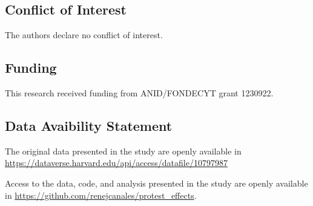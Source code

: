 \documentclass[
  12pt,
  letterpaper,
  DIV=11,
  numbers=noendperiod]{scrartcl}
\begin{document}
\subsection{Conflict of Interest}\label{conflict-of-interest}

The authors declare no conflict of interest.

\subsection{Funding}\label{funding}

This research received funding from ANID/FONDECYT grant 1230922.

\subsection{Data Avaibility Statement}\label{data-avaibility-statement}

The original data presented in the study are openly available in
\url{https://dataverse.harvard.edu/api/access/datafile/10797987}

Access to the data, code, and analysis presented in the study are openly
available in \url{https://github.com/renejcanales/protest_effects}.
\end{document}
